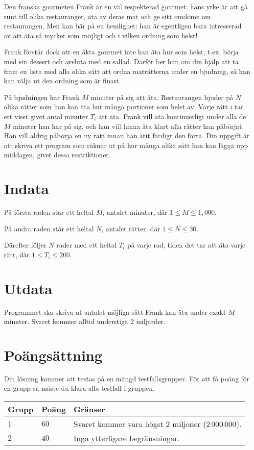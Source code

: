 Den franska gourmeten Frank är en väl respekterad gourmet; hans yrke är att gå runt till olika restauranger, äta av deras mat och ge sitt omdöme om restaurangen.
Men han bär på en hemlighet: han är egentligen bara intresserad av att äta så mycket som möjligt och i vilken ordning som helst!

Frank förstår dock att en äkta gourmet inte kan äta hur som helst, t.ex. börja med sin dessert och avsluta med en sallad.
Därför ber han om din hjälp att ta fram en lista med alla olika sätt att ordna maträtterna under en bjudning, så han kan välja ut den ordning som är finast.

På bjudningen har Frank $M$ minuter på sig att äta.
Restaurangen bjuder på $N$ olika rätter som han kan äta hur många portioner som helst av.
Varje rätt $i$ tar ett visst givet antal minuter $T_i$ att äta.
Frank vill äta kontinuerligt under alla de $M$ minuter han har på sig, och han vill hinna äta klart alla rätter han påbörjat.
Han vill aldrig påbörja en ny rätt innan han ätit färdigt den förra.
Din uppgift är att skriva ett program som räknar ut på hur många olika sätt han kan lägga upp middagen, givet dessa restriktioner.

\section*{Indata}
På första raden står ett heltal $M$, antalet minuter, där $1 \le M \le 1,000$.

På andra raden står ett heltal $N$, antalet rätter, där $1 \le N \le 30$.

Därefter följer $N$ rader med ett heltal $T_i$ på varje rad, tiden det tar att äta varje rätt, där $1 \le T_i \le 200$.

\section*{Utdata}
Programmet ska skriva ut antalet möjliga sätt Frank kan äta under exakt $M$ minuter.
Svaret kommer alltid understiga $2$ miljarder.

\section*{Poängsättning}
Din lösning kommer att testas på en mängd testfallsgrupper.
För att få poäng för en grupp så måste du klara alla testfall i gruppen.

\noindent
\begin{tabular}{| l | l | p{12cm} |}
  \hline
  \textbf{Grupp} & \textbf{Poäng} & \textbf{Gränser} \\ \hline
  $1$    & $60$        & Svaret kommer vara högst $2$ miljoner ($2\,000\,000$). \\ \hline 
  $2$    & $40$        & Inga ytterligare begränsningar. \\ \hline
\end{tabular}


